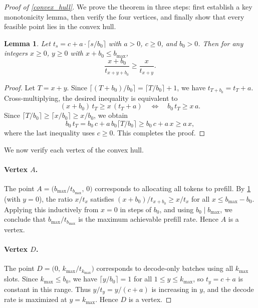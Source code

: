 \documentclass[10pt,a4paper]{amsart}
\newtheorem{lemma}{Lemma}
\begin{document}
\begin{proof}[Proof of \cref{convex_hull}]
We prove the theorem in three steps: first establish a key monotonicity lemma, then verify the four vertices, and finally show that every feasible point lies in the convex hull.

\begin{lemma} \label{lem:monotonicity}
Let \( t_s = c + a \cdot \lceil s/b_0 \rceil \) with \( a > 0 \), \( c \ge 0 \), and \( b_0 > 0 \). Then for any integers \( x \ge 0 \), \( y \ge 0 \) with \( x + b_0 \le b_{\max} \),
\[
\frac{x + b_0}{t_{x + y + b_0}} \ge \frac{x}{t_{x + y}}.
\]
\end{lemma}

\begin{proof}
Let \( T = x + y \). Since \( \lceil (T + b_0)/b_0 \rceil = \lceil T/b_0 \rceil + 1 \), we have \( t_{T + b_0} = t_T + a \). Cross-multiplying, the desired inequality is equivalent to
\[
(x + b_0)\, t_T \ge x\, (t_T + a) \quad \Longleftrightarrow \quad b_0\, t_T \ge x\, a.
\]
Since \( \lceil T/b_0 \rceil \ge \lceil x/b_0 \rceil \ge x/b_0 \), we obtain
\[
b_0\, t_T = b_0\, c + a\, b_0 \lceil T/b_0 \rceil \ge b_0\, c + a\, x \ge a\, x,
\]
where the last inequality uses \( c \ge 0 \). This completes the proof.
\end{proof}

We now verify each vertex of the convex hull.

\paragraph{Vertex $A$.} The point \( A = \bigl( b_{\max}/t_{b_{\max}},\, 0 \bigr) \) corresponds to allocating all tokens to prefill. By \cref{lem:monotonicity} (with \( y = 0 \)), the ratio \( x/t_x \) satisfies \( (x + b_0)/t_{x+b_0} \ge x/t_x \) for all \( x \le b_{\max} - b_0 \). Applying this inductively from \( x = 0 \) in steps of \( b_0 \), and using \( b_0 \mid b_{\max} \), we conclude that \( b_{\max}/t_{b_{\max}} \) is the maximum achievable prefill rate. Hence \( A \) is a vertex.

\paragraph{Vertex $D$.} The point \( D = \bigl( 0,\, k_{\max}/t_{k_{\max}} \bigr) \) corresponds to decode-only batches using all \( k_{\max} \) slots. Since \( k_{\max} \le b_0 \), we have \( \lceil y/b_0 \rceil = 1 \) for all \( 1 \le y \le k_{\max} \), so \( t_y = c + a \) is constant in this range. Thus \( y/t_y = y/(c + a) \) is increasing in \( y \), and the decode rate is maximized at \( y = k_{\max} \). Hence \( D \) is a vertex.


\end{proof}
\end{document}
